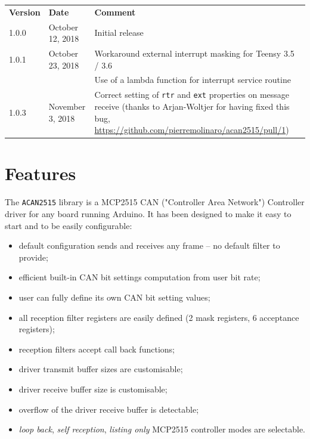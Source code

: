 \documentclass[10pt, a4paper, obeyspaces, openany]{extarticle}
\begin{document}
\begin{center}
  \begin{tabular}{llp{10cm}}
    \textbf{Version} & \textbf{Date} & \textbf{Comment}\\
    1.0.0 & October 12, 2018 & Initial release \\
    1.0.1 & October 23, 2018 & Workaround external interrupt masking for Teensy 3.5 / 3.6\\
          &          & Use of a lambda function for interrupt service routine \\
    1.0.3 & November 3, 2018 & Correct setting of \texttt{rtr} and \texttt{ext} properties on message receive (thanks to Arjan-Woltjer for having fixed this bug, \url{https://github.com/pierremolinaro/acan2515/pull/1}) \\
  \end{tabular}
\end{center}

\section{Features}

The \texttt{ACAN2515} library is a MCP2515 CAN ("Controller Area Network") Controller driver for any board running Arduino. It has been designed to make it easy to start and to be easily configurable:
\begin{itemize}
  \item default configuration sends and receives any frame -- no default filter to provide;
  \item efficient built-in CAN bit settings computation from user bit rate;
  \item user can fully define its own CAN bit setting values;
  \item all reception filter registers are easily defined (2 mask registers, 6 acceptance registers);
  \item reception filters accept call back functions;
  \item driver transmit buffer sizes are customisable;
  \item driver receive buffer size is customisable;
  \item overflow of the driver receive buffer is detectable;
  \item \emph{loop back}, \emph{self reception}, \emph{listing only} MCP2515 controller modes are selectable.
\end{itemize}
\end{document}
